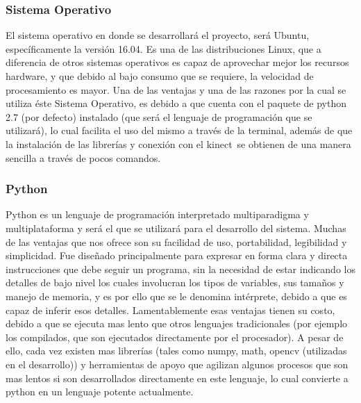 \documentclass[a4paper,openright,12pt]{report}
\begin{document}
\subsubsection{Sistema Operativo}
El sistema operativo en donde se desarrollará el proyecto, será Ubuntu, específicamente la versión 16.04. Es una de las distribuciones Linux, que a diferencia de otros sistemas operativos es capaz de aprovechar mejor los recursos hardware, y que debido al bajo consumo que se requiere, la velocidad de procesamiento es mayor. Una de las ventajas y una de las razones por la cual se utiliza éste Sistema Operativo, es debido a que cuenta con el paquete de python 2.7 (por defecto) instalado (que será el lenguaje de programación que se utilizará), lo cual facilita el uso del mismo a través de la terminal, además de que la instalación de las librerías y conexión con el kinect\textcopyright\ se obtienen de una manera sencilla a través de pocos comandos. 
\subsubsection{Python}
Python es un lenguaje de programación interpretado multiparadigma y multiplataforma y será el que se utilizará para el desarrollo del sistema. Muchas de las ventajas que nos ofrece son su facilidad de uso, portabilidad, legibilidad y simplicidad. Fue diseñado principalmente para expresar en forma clara y directa instrucciones que debe seguir un programa, sin la necesidad de estar indicando los detalles de bajo nivel los cuales involucran los tipos de variables, sus tamaños y manejo de memoria, y es por ello que se le denomina intérprete, debido a que es capaz de inferir esos detalles. Lamentablemente esas ventajas tienen su costo, debido a que se ejecuta mas lento que otros lenguajes tradicionales (por ejemplo los compilados, que son ejecutados directamente por el procesador). A pesar de ello, cada vez existen mas librerías (tales como numpy, math, opencv (utilizadas en el desarrollo)) y herramientas de apoyo que agilizan algunos procesos que son mas lentos si son desarrollados directamente en este lenguaje, lo cual convierte a python en un lenguaje potente actualmente. 
\end{document}
